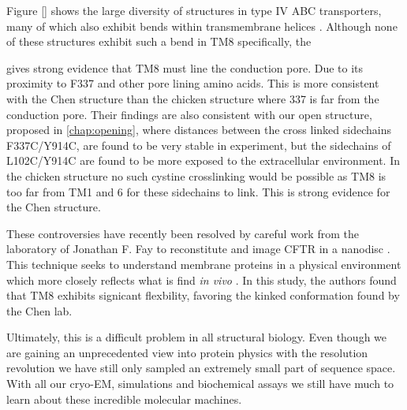 
Figure \ref{} shows the large diversity of structures in type IV ABC transporters, many of which also exhibit bends within transmembrane helices \cite{thomas2020}. Although none of these structures exhibit such a bend in TM8 specifically, the 

\cite{negoda2019} gives strong evidence that TM8 must line the conduction pore. Due to its proximity to F337 and other pore lining amino acids. This is more consistent with the Chen structure than the chicken structure where 337 is far from the conduction pore. Their findings are also consistent with our open structure, proposed in \ref{chap:opening}, where distances between the cross linked sidechains F337C/Y914C, are found to be very stable in experiment, but the sidechains of L102C/Y914C are found to be more exposed to the extracellular environment. In the chicken structure no such cystine crosslinking would be possible as TM8 is too far from TM1 and 6 for these sidechains to link. This is strong evidence for the Chen structure.

These controversies have recently been resolved by careful work from the laboratory of Jonathan F. Fay to reconstitute and image CFTR in a nanodisc \cite{aleksandrov2022}. This technique seeks to understand membrane proteins in a physical environment which more closely reflects what is find \textit{in vivo} \cite{}. In this study, the authors found that TM8 exhibits signicant flexbility, favoring the kinked conformation found by the Chen lab.

Ultimately, this is a difficult problem in all structural biology. Even though we are gaining an unprecedented view into protein physics with the resolution revolution we have still only sampled an extremely small part of sequence space. With all our cryo-EM, simulations and biochemical assays we still have much to learn about these incredible molecular machines.




